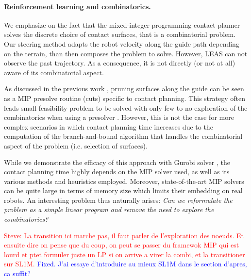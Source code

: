 \paragraph{Reinforcement learning and combinatorics.}

We emphasize on the fact that the mixed-integer programming contact planner solves the discrete choice of contact surfaces, that is a combinatorial problem.
Our steering method adapts the robot velocity along the guide path depending on the terrain, than then composes the problem to solve. 
However, LEAS can not observe the past trajectory. 
As a consequence, it is not directly (or not at all) aware of its combinatorial aspect. 

As discussed in the previous work \cite{sl1m_v2}, pruning surfaces along the guide can be seen as a MIP presolve routine (cuts) specific to contact planning.
This strategy often leads small feasibility problem to be solved with only few to no exploration of the combinatorics when using a presolver \cite{presolve_gurobi_2020}.
However, this is not the case for more complex scenarios in which contact planning time increases due to the computation of the branch-and-bound algorithm that handles the combinatorial aspect of the problem (i.e. selection of surfaces).

While we demonstrate the efficacy of this approach with Gurobi solver \cite{gurobi}, the contact planning time highly depends on the MIP solver used, as well as its various methods and heuristics employed.
Moreover, state-of-the-art MIP solvers can be quite large in terms of memory size which limits their embedding on real robots.
An interesting problem thus naturally arises: \textit{Can we reformulate the problem as a simple linear program and remove the need to explore the combinatorics?}


\textcolor{red}{Steve: La transition ici marche pas, il faut parler de l'exploration des noeuds. Et ensuite dire on pense que du coup, on peut se passer du framewok MIP qui est lourd et ptet formuler juste un LP si on arrive a virer la combi, et la transitioner sur SL1M.}
\textcolor{blue}{Fixed. J'ai essaye d'introduire au mieux SL1M dans le section d'apres, ca suffit?}

